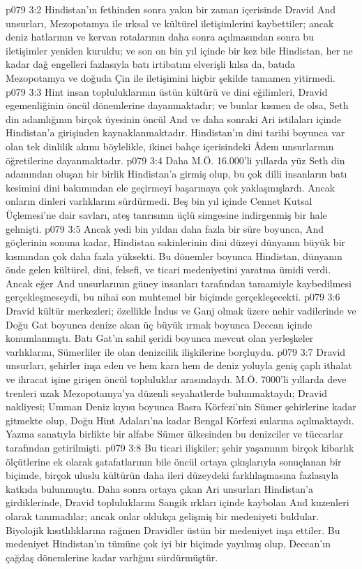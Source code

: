 \vs p079 3:2 Hindistan’ın fethinden sonra yakın bir zaman içerisinde Dravid And unsurları, Mezopotamya ile ırksal ve kültürel iletişimlerini kaybettiler; ancak deniz hatlarının ve kervan rotalarının daha sonra açılmasından sonra bu iletişimler yeniden kuruldu; ve son on bin yıl içinde bir kez bile Hindistan, her ne kadar dağ engelleri fazlasıyla batı irtibatını elverişli kılsa da, batıda Mezopotamya ve doğuda Çin ile iletişimini hiçbir şekilde tamamen yitirmedi.
\vs p079 3:3 Hint insan topluluklarının üstün kültürü ve dini eğilimleri, Dravid egemenliğinin öncül dönemlerine dayanmaktadır; ve bunlar kısmen de olsa, Seth din adamlığının birçok üyesinin öncül And ve daha sonraki Ari istilaları içinde Hindistan’a girişinden kaynaklanmaktadır. Hindistan’ın dini tarihi boyunca var olan tek dinlilik akımı böylelikle, ikinci bahçe içerisindeki Âdem unsurlarının öğretilerine dayanmaktadır.
\vs p079 3:4 Daha M.Ö. 16.000’li yıllarda yüz Seth din adamından oluşan bir birlik Hindistan’a girmiş olup, bu çok dilli insanların batı kesimini dini bakımından ele geçirmeyi başarmaya çok yaklaşmışlardı. Ancak onların dinleri varlıklarını sürdürmedi. Beş bin yıl içinde Cennet Kutsal Üçlemesi’ne dair savları, ateş tanrısının üçlü simgesine indirgenmiş bir hale gelmişti.
\vs p079 3:5 Ancak yedi bin yıldan daha fazla bir süre boyunca, And göçlerinin sonuna kadar, Hindistan sakinlerinin dini düzeyi dünyanın büyük bir kısmından çok daha fazla yüksekti. Bu dönemler boyunca Hindistan, dünyanın önde gelen kültürel, dini, felsefi, ve ticari medeniyetini yaratma ümidi verdi. Ancak eğer And unsurlarının güney insanları tarafından tamamiyle kaybedilmesi gerçekleşmeseydi, bu nihai son muhtemel bir biçimde gerçekleşecekti.
\vs p079 3:6 Dravid kültür merkezleri; özellikle İndus ve Ganj olmak üzere nehir vadilerinde ve Doğu Gat boyunca denize akan üç büyük ırmak boyunca Deccan içinde konumlanmıştı. Batı Gat’ın sahil şeridi boyunca mevcut olan yerleşkeler varlıklarını, Sümerliler ile olan denizcilik ilişkilerine borçluydu.
\vs p079 3:7 Dravid unsurları, şehirler inşa eden ve hem kara hem de deniz yoluyla geniş çaplı ithalat ve ihracat işine girişen öncül topluluklar arasındaydı. M.Ö. 7000’li yıllarda deve trenleri uzak Mezopotamya’ya düzenli seyahatlerde bulunmaktaydı; Dravid nakliyesi; Umman Deniz kıyısı boyunca Basra Körfezi’nin Sümer şehirlerine kadar gitmekte olup, Doğu Hint Adaları’na kadar Bengal Körfezi sularına açılmaktaydı. Yazma sanatıyla birlikte bir alfabe Sümer ülkesinden bu denizciler ve tüccarlar tarafından getirilmişti.
\vs p079 3:8 Bu ticari ilişkiler; şehir yaşamının birçok kibarlık ölçütlerine ek olarak şatafatlarının bile öncül ortaya çıkışlarıyla sonuçlanan bir biçimde, birçok uluslu kültürün daha ileri düzeydeki farklılaşmasına fazlasıyla katkıda bulunmuştu. Daha sonra ortaya çıkan Ari unsurları Hindistan’a girdiklerinde, Dravid topluluklarını Sangik ırkları içinde kaybolan And kuzenleri olarak tanımadılar; ancak onlar oldukça gelişmiş bir medeniyeti buldular. Biyolojik kısıtlılıklarına rağmen Dravidler üstün bir medeniyet inşa ettiler. Bu medeniyet Hindistan’ın tümüne çok iyi bir biçimde yayılmış olup, Deccan’ın çağdaş dönemlerine kadar varlığını sürdürmüştür.
